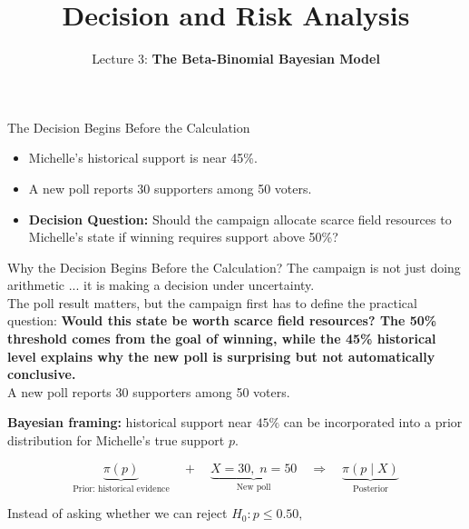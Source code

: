 \documentclass[aspectratio=43,11pt]{beamer}
\title{Decision and Risk Analysis}
\subtitle{Lecture 3: \textbf{The Beta-Binomial Bayesian Model}}
\author{}
\date{
\color{aggiemaroon}{
DAEN 427 / ISEN 427 / ISEN 627 - Fall 2026\\
\textbf{Alexander Abuabara}
}
}
\begin{document}
  \begin{frame}[plain]
    \titlepage
  \end{frame}

  {
    \begin{frame}{The Decision Begins Before the Calculation}
      \large
      \begin{itemize}
        \item Michelle's historical support is near 45\%.\\
        \item A new poll reports 30 supporters among 50 voters.\\
        \item {\bf Decision Question:} Should the campaign allocate scarce field resources to Michelle's state if winning requires support above 50\%?
      \end{itemize}
    \end{frame}
  
    \begin{frame}{Why the Decision Begins Before the Calculation?}
      \large
      \pause
      The campaign is not just doing arithmetic ... it is making a decision under uncertainty.\\
      
      The poll result matters, but the campaign first has to define the practical question: {\bf Would this state be worth scarce field resources? The 50\% threshold comes from the goal of winning, while the 45\% historical level explains why the new poll is surprising but not automatically conclusive.}\\
      
      A new poll reports 30 supporters among 50 voters.
    \end{frame}
    
    \begin{frame}{}
      \textbf{Bayesian framing:} historical support near \(45\%\) can be incorporated
      into a prior distribution for Michelle's true support \(p\).

      \[
      \underbrace{\pi(p)}_{\text{Prior: historical evidence}}
      \quad + \quad
      \underbrace{X=30,\; n=50}_{\text{New poll}}
      \quad \Longrightarrow \quad
      \underbrace{\pi(p\mid X)}_{\text{Posterior}}
      \]

      Instead of asking whether we can reject
      $
      H_0:p\leq 0.50,
      $


\end{frame}}
\end{document}
